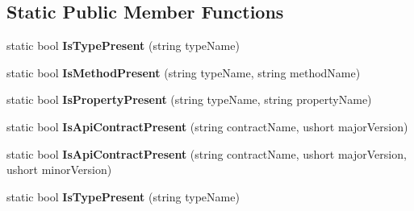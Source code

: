 \subsection*{Static Public Member Functions}
\begin{DoxyCompactItemize}
\item 
\mbox{\label{class_windows_1_1_foundation_1_1_metadata_1_1_api_information_a7347d63bdbf96f8c7d2b5e7e632abf49}} 
static bool {\bfseries Is\+Type\+Present} (string type\+Name)
\item 
\mbox{\label{class_windows_1_1_foundation_1_1_metadata_1_1_api_information_a635934986da247463159c438b6e461e2}} 
static bool {\bfseries Is\+Method\+Present} (string type\+Name, string method\+Name)
\item 
\mbox{\label{class_windows_1_1_foundation_1_1_metadata_1_1_api_information_aa0236a143b0a7957254d0f59f21fef88}} 
static bool {\bfseries Is\+Property\+Present} (string type\+Name, string property\+Name)
\item 
\mbox{\label{class_windows_1_1_foundation_1_1_metadata_1_1_api_information_a673f6136fdd5584f69c299b8c5495aa5}} 
static bool {\bfseries Is\+Api\+Contract\+Present} (string contract\+Name, ushort major\+Version)
\item 
\mbox{\label{class_windows_1_1_foundation_1_1_metadata_1_1_api_information_ad08ace5ceb179078666548e256829344}} 
static bool {\bfseries Is\+Api\+Contract\+Present} (string contract\+Name, ushort major\+Version, ushort minor\+Version)
\item 
\mbox{\label{class_windows_1_1_foundation_1_1_metadata_1_1_api_information_a7347d63bdbf96f8c7d2b5e7e632abf49}} 
static bool {\bfseries Is\+Type\+Present} (string type\+Name)
\item 
\mbox{\label{class_windows_1_1_foundation_1_1_metadata_1_1_api_information_a635934986da247463159c438b6e461e2}} 

\end{DoxyCompactItemize}
